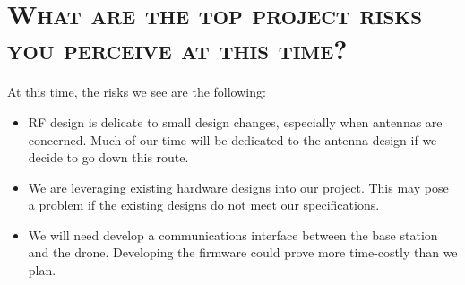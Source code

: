 \documentclass[11pt]{article}
\numberwithin{figure}{section}
\begin{document}
\section{\textsc{What are the top project risks you perceive at this time?}}
	At this time, the risks we see are the following:
	\begin{itemize}
		\item RF design is delicate to small design changes, especially when antennas are concerned.  Much of our time will be dedicated to the antenna design if we decide to go down this route.
		\item We are leveraging existing hardware designs into our project.  This may pose a problem if the existing designs do not meet our specifications.
		\item We will need develop a communications interface between the base station and the drone.  Developing the firmware could prove more time-costly than we plan.
	\end{itemize}
\end{document}
